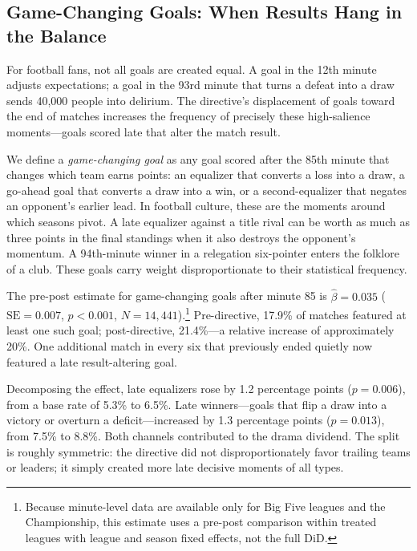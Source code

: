 


\subsection{Game-Changing Goals: When Results Hang in the Balance}
\label{subsec:game_changing}

For football fans, not all goals are created equal. A goal in the 12th minute adjusts expectations; a goal in the 93rd minute that turns a defeat into a draw sends 40,000 people into delirium. The directive's displacement of goals toward the end of matches increases the frequency of precisely these high-salience moments---goals scored late that alter the match result.

We define a \emph{game-changing goal} as any goal scored after the 85th minute that changes which team earns points: an equalizer that converts a loss into a draw, a go-ahead goal that converts a draw into a win, or a second-equalizer that negates an opponent's earlier lead. In football culture, these are the moments around which seasons pivot. A late equalizer against a title rival can be worth as much as three points in the final standings when it also destroys the opponent's momentum. A 94th-minute winner in a relegation six-pointer enters the folklore of a club. These goals carry weight disproportionate to their statistical frequency.

The pre-post estimate for game-changing goals after minute 85 is $\hat{\beta} = 0.035$ ($\text{SE} = 0.007$, $p < 0.001$, $N = 14{,}441$).\footnote{Because minute-level data are available only for Big Five leagues and the Championship, this estimate uses a pre-post comparison within treated leagues with league and season fixed effects, not the full DiD.} Pre-directive, 17.9\% of matches featured at least one such goal; post-directive, 21.4\%---a relative increase of approximately 20\%. One additional match in every six that previously ended quietly now featured a late result-altering goal.

Decomposing the effect, late equalizers rose by 1.2 percentage points ($p = 0.006$), from a base rate of 5.3\% to 6.5\%. Late winners---goals that flip a draw into a victory or overturn a deficit---increased by 1.3 percentage points ($p = 0.013$), from 7.5\% to 8.8\%. Both channels contributed to the drama dividend. The split is roughly symmetric: the directive did not disproportionately favor trailing teams or leaders; it simply created more late decisive moments of all types.

